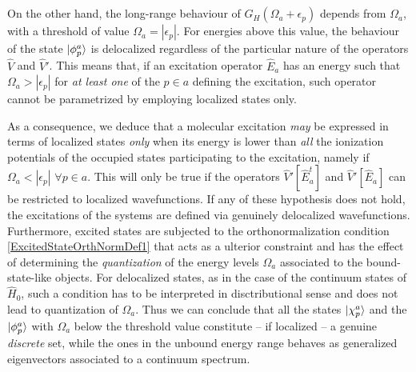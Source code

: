 \documentclass[reprint,aps,prb]{revtex4-1}
\newcommand{\eps}{\epsilon}
\newcommand{\op}[1]{\hat {#1}}
\newcommand{\hnot}{\op{H}_0}
\begin{document}
On the other hand, the long-range behaviour of $\op G_H(\Omega_a+\eps_p)$ depends from 
$\Omega_a$, with a threshold of value $\Omega_a=|\eps_p|$. 
For energies above this value, the behaviour of the state $\ket{\phi^a_p}$ is 
delocalized regardless of the particular nature of the operators $\op V$ and $\op V'$.
This means that, if an excitation operator $\op E_a$ has an energy such that
$\Omega_a>|\eps_p|$  for \emph{at least one} of the $p \in a$ defining the excitation,
such operator cannot be parametrized by employing localized states only.

As a consequence, we deduce that a molecular excitation \emph{may} be expressed in terms of localized states
\emph{only} when its energy is lower than \emph{all} the ionization potentials of the occupied states participating to the excitation,
namely if $\Omega_a<|\eps_p|$ $\forall p \in a$. This will only be true if the operators
$\op V'[\op E^t_a]$ and $\op V'[\op E_a]$ can be restricted to localized wavefunctions.
If any of these hypothesis does not hold, the excitations of the systems are defined via genuinely delocalized wavefunctions.
Furthermore, excited states are subjected to the orthonormalization condition 
\eqref{ExcitedStateOrthNormDef1} that acts as a ulterior constraint and has the effect of determining the \emph{quantization}
of the energy levels $\Omega_a$ associated to the bound-state-like objects.
For delocalized states, as in the case of the continuum states of $\hnot$,
such a condition has to be interpreted in disctributional sense and does not lead to quantization of $\Omega_a$.
Thus we can conclude that all the states $\ket{\chi^a_p}$ and the $\ket{\phi^a_p}$ with $\Omega_a$ below the threshold value constitute 
-- if localized -- a genuine \emph{discrete} set, while the ones in the unbound energy range behaves as generalized eigenvectors associated to a
continuum spectrum. 
\end{document}
